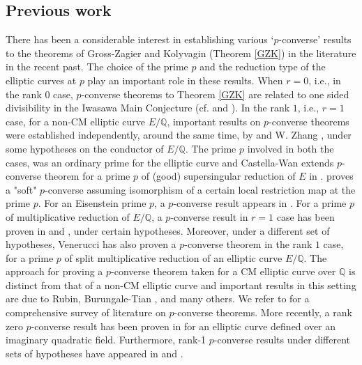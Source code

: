 \documentclass[reqno,10pt]{amsart}
\newcommand{\q}{\mathbb{Q}}
\theoremstyle{plain}
\theoremstyle{definition}
\begin{document}
\subsection{Previous work} There has been a considerable interest in establishing various   `$p$-converse' results  to the theorems of Gross-Zagier and Kolyvagin (Theorem \ref{GZK}) in the literature in the recent past. The choice of the prime $p$  and the reduction type of the  elliptic curves  at $p$ play an important role in these results. When $r=0$, i.e., in the rank $0$ case, $p$-converse theorems to Theorem \ref{GZK} are related to  one sided divisibility in the Iwasawa Main Conjecture (cf. \cite{SkinnerUrban} and \cite{SkinnerRank0}). In the rank $1$, i.e., $r=1$ case, for a non-CM elliptic curve $E/\q$, important results on $p$-converse theorems were established independently, around the same time, by \cite{SkinnerPConverse} and W. Zhang \cite{ZhangPConverse}, under some  hypotheses on the conductor of $E/\q$. The prime $p$ involved in both the cases, was an ordinary prime for the elliptic curve and  Castella-Wan extends $p$-converse theorem  for a prime $p$ of  (good) supersingular reduction of $E$ in \cite{CastellaWanPConverse}.  \cite{KimPConverse} proves a "soft" $p$-converse assuming isomorphism of a certain local restriction map at the prime $p$. %
For an Eisenstein prime $p$, a $p$-converse result appears in \cite{CGLS}. For a prime $p$ of multiplicative reduction of $E/\q$, a $p$-converse result in $r=1 $ case has been proven in \cite{skinner2014indivisibilityheegnerpointsmultiplicative} and \cite{castella2024exceptionalzerosheegnerpoints}, under certain hypotheses. Moreover, under a different set of hypotheses, Venerucci \cite{Rodolfo} has also proven a $p$-converse theorem in the rank $1$ case, for a prime $p$ of split multiplicative reduction of an elliptic curve  $E/\q$. The approach for proving a $p$-converse theorem taken for a CM elliptic curve over $\q$ is distinct from that of a non-CM elliptic curve and important results in this setting are due to Rubin,  Burungale-Tian \cite{BurungaleTian}, and many others. We refer to \cite{pConverseSurvey} for a comprehensive survey of literature on  $p$-converse theorems. More recently, a rank zero $p$-converse result  has been proven in \cite{BurungaleTian2} for an elliptic curve defined over an imaginary quadratic field. Furthermore, rank-1 $p$-converse results under different sets of  hypotheses have appeared in \cite{Skinner2025} and \cite{Skinner2026}.
\\
\end{document}
